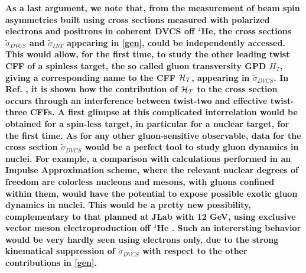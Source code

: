 \documentclass[times, twoside]{PosWhiPap}
\begin{document}
{\bf As a last argument,
we note that, from the measurement of 
beam spin asymmetries built using 
cross sections measured with polarized electrons and positrons
in coherent DVCS off $^4$He, the 
cross sections $\tilde 
\sigma_{DVCS}$
and $\tilde 
\sigma_{INT}$
appearing in \eqref{gen},
could be independently accessed.
This would allow,
for the first time, 
to study the other leading twist CFF of a spinless target,
the so called  gluon transversity GPD $H_T$, giving a corresponding
name to the CFF ${\cal{H}}_T$, appearing in
$\tilde  \sigma_{DVCS}$. In Ref. 
\cite{Belitsky:2008bz}, it is shown how
the contribution of ${\cal{H}}_T$ to the cross section
occurs through an interference between twist-two
and effective twist-three CFFs. A first glimpse at this complicated interrelation
would be obtained for a spin-less target, in particular for a nuclear target,
for the first time.
As for any other gluon-sensitive observable, data for the cross section
$\tilde  \sigma_{DVCS}$ would be a perfect tool to study gluon dynamics in nuclei. For example, a comparison with calculations performed in an Impulse Approximation scheme, where the relevant nuclear degrees of freedom
are colorless nucleons and mesons, with gluons confined within them, would
have the potential to expose possible exotic gluon dynamics in nuclei.
This would be a pretty new possibility, complementary to that planned at JLab
with 12 GeV, using exclusive vector meson electroproduction off
$^4$He \cite{Armstrong:2017zcm}.
Such an interersting behavior would be very hardly seen using electrons only,
due to the strong kinematical suppression of $\tilde  \sigma_{DVCS}$ with respect to
the other contributions in \eqref{gen}.
}
\end{document}
